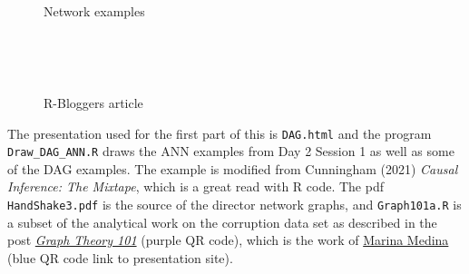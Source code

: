\documentclass[
  letterpaper,
]{book}
\begin{document}
\begin{figure}
\begin{minipage}[t]{0.40\linewidth}
{{}

\caption{R-Bloggers article}

}

\end{minipage}%
%
\begin{minipage}[t]{0.05\linewidth}

{\centering 

~

}

\end{minipage}%
\newline
\begin{minipage}[t]{0.05\linewidth}

{\centering 

~

}

\end{minipage}%
%
\begin{minipage}[t]{0.40\linewidth}

{\centering 

Network examples

}

\end{minipage}%
%
\begin{minipage}[t]{0.10\linewidth}

{\centering 

~

}

\end{minipage}%
%
\begin{minipage}[t]{0.05\linewidth}

{\centering 

~

}

\end{minipage}%

\end{figure}

The presentation used for the first part of this is \texttt{DAG.html}
and the program \texttt{Draw\_DAG\_ANN.R} draws the ANN examples from
Day 2 Session 1 as well as some of the DAG examples. The example is
modified from Cunningham (2021) \emph{Causal Inference: The Mixtape},
which is a great read with R code. The pdf \texttt{HandShake3.pdf} is
the source of the director network graphs, and \texttt{Graph101a.R} is a
subset of the analytical work on the corruption data set as described in
the post
\href{https://www.r-bloggers.com/2020/01/graph-theory-101-with-corruption-cases-in-spain/}{\emph{Graph
Theory 101}} (purple QR code), which is the work of
\href{https://codingclubuc3m.rbind.io/talk/2020-01-21/}{Marina Medina}
(blue QR code link to presentation site).
\end{document}
